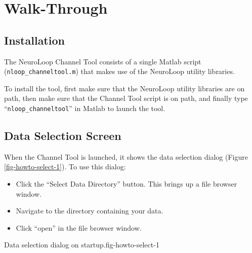 
\chapter{Walk-Through}
\label{sect-howto}

%
%
\section{Installation}
\label{sect-howto-install}

The NeuroLoop Channel Tool consists of a single Matlab script
(\verb|nloop_channeltool.m|) that makes use of the NeuroLoop utility
libraries.

To install the tool, first make sure that the NeuroLoop utility libraries
are on path, then make sure that the Channel Tool script is on path, and
finally type ``\verb|nloop_channeltool|'' in Matlab to launch the tool.

%
%
\section{Data Selection Screen}
\label{sect-howto-select}

When the Channel Tool is launched, it shows the data selection dialog
(Figure \ref{fig-howto-select-1}). To use this dialog:
\begin{itemize}
\item Click the ``Select Data Directory'' button. This brings up a file
browser window.
\item Navigate to the directory containing your data.
\item Click ``open'' in the file browser window.
\end{itemize}

{Data selection dialog on startup.}{fig-howto-select-1}

